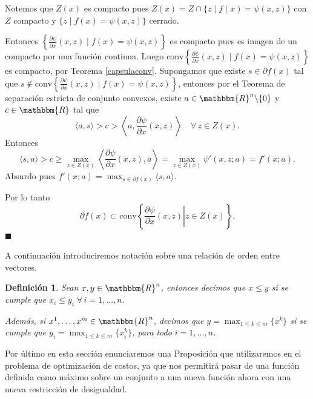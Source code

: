 \documentclass[a4paper,12pt]{report}
\newcommand{\la}{\langle}
\newcommand{\ra}{\rangle}
\newcommand{\RR}{\mathbbm{R}}
\newcommand{\Rn}{\RR^n}
\newcommand{\sdif}{\partial f(x)}
\newtheorem{defi}[teo]{Definici\'on}
\newenvironment{dem}{\vspace*{-0.1cm}{\it Demostraci\'on:}}{\hfill
$\blacksquare$\\}
\begin{document}
\begin{dem}
Notemos que $Z(x)$ es compacto pues $Z(x)=Z\cap\{z\mid f(x)=\psi(x,z)\}$ con $Z$ compacto y  $\{z\mid f(x)=\psi(x,z)\}$ cerrado.

Entonces $\left\{\frac{\partial \psi}{\partial x}(x,z)\mid f(x)=\psi(x,z)\right\}$ es compacto pues es imagen de un compacto por una funci\'on continua.
Luego $\mathrm{conv}\left\{\frac{\partial \psi}{\partial x}(x,z)\mid f(x)=\psi(x,z)\right\}$ es compacto, por Teorema \ref{capsulaconv}.
Supongamos que existe $s\in\sdif$ tal que \linebreak $s\notin \mathrm{conv}\left\{\frac{\partial \psi}{\partial x}(x,z)\mid f(x)=\psi(x,z)\right\}$, entonces por el Teorema de separaci\'on estricta de conjunto convexos, existe $a\in\Rn\backslash\{0\}$ y $c\in\RR$ tal que
$$\la a,s\ra>c>\left\la a,\frac{\partial \psi}{\partial x}(x,z)\right\ra\quad\forall\,z\in Z(x).$$
Entonces
$$\la s,a\ra> c\geq \max_{z\in Z(x)}\left\la\frac{\partial \psi}{\partial x}(x,z),a\right\ra=\max_{z\in Z(x)}\psi'(x,z;a)=f'(x;a).$$
Absurdo pues $f'(x;a)=\displaystyle\max_{s\in\sdif}\la s,a\ra$.

Por lo tanto
$$\sdif\subset\mathrm{conv}\left\{\left.\frac{\partial \psi}{\partial x}(x,z)\right| z\in Z(x)\right\}.$$
\end{dem}


A continuaci\'on introduciremos notaci\'on sobre una relaci\'on de orden entre vectores.
\begin{defi}
Sean $x,y\in\Rn$, entonces decimos que $x\leq y$ si se cumple que $x_i\leq y_i\;\forall\,i=1,\ldots,n$.

Adem\'as, si $x^1,\ldots,x^m\in\Rn$, decimos que $y=\displaystyle\max_{1\leq k\leq m}\{x^k\}$ si se cumple que $y_i=\displaystyle\max_{1\leq k\leq m}\{x_i^k\}$, para todo $i=1,\ldots,n$.

\end{defi}

Por \'ultimo en esta secci\'on enunciaremos una Proposici\'on que utilizaremos en el problema de optimizaci\'on de costos, ya que nos permitir\'a pasar de una funci\'on definida como m\'aximo sobre un conjunto a una nueva funci\'on ahora con una nueva restricci\'on de desigualdad.
\end{document}
